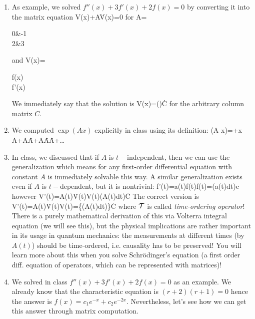 {\begin{enumerate}
		\item As example, we solved $f''(x)+3f'(x)+2f(x)=0$ by converting it into the matrix equation
		\be 
		V(x)+A\. V(x)=0
		\ee 
		for 
		\be 
		A=\begin{pmatrix}
			0&-1\\2&3
		\end{pmatrix}
		\ee
		and
		\be 
		V(x)=\begin{pmatrix}
			f(x)\\f'(x)
		\end{pmatrix}
		\ee 
		We immediately say that the solution is 
		\be 
		V(x)=()\. C
		\ee 
		for the arbitrary column matrix $C$.
		\item We computed $\exp(A x)$ explicitly in class using its definition:
		\be 
		\exp(A x)=+x A+A\.A+A\.A\.A+\dots
		\ee 
		\item In class, we discussed that if $A$ is $t-$independent, then we can use the generalization
		\be 
		\left[f'(t)=af(t)\rightarrow f(t)=\exp(at)c\right]\Rightarrow\left[V'(t)=A\.V(t)\rightarrow V(t)=\exp(At)\.C\right]
		\ee
		which means for any first-order differential equation with constant $A$ is immediately solvable this way. A similar generalization exists even if $A$ is $t-$dependent, but it is nontrivial: 
		\be 
		f'(t)=a(t)f(t)\rightarrow f(t)=\exp\left(\int a(t)dt\right)c
		\ee
		however
		\be 
		V'(t)=A(t)\.V(t)\rightarrow V(t)\ne \exp\left(\int A(t)dt\right)\.C
		\ee 
		The correct version is 
		\be 
		V'(t)=A(t)\.V(t)\rightarrow V(t)=\left\{\exp\left(\int A(t)dt\right)\right\}\.C
		\ee 
		where $\mathcal{T}$ is called \emph{time-ordering operator}! There is a purely mathematical derivation of this via Volterra integral equation (we will see this), but the physical implications are rather important in its usage in quantum mechanics: the measurements at different times (by $A(t)$) should be time-ordered, i.e. causality has to be preserved! You will learn more about this when you solve Schrödinger's equation (a first order diff. equation of operators, which can be represented with matrices)!
		\item We solved in class $f''(x)+3f'(x)+2f(x)=0$ as an example. We already know that the characteristic equation is $(r+2)(r+1)=0$ hence the answer is $f(x)=c_1 e^{-x}+c_2 e^{-2x}$. Nevertheless, let's see how we can get this answer through matrix computation.
		

\end{enumerate}}
